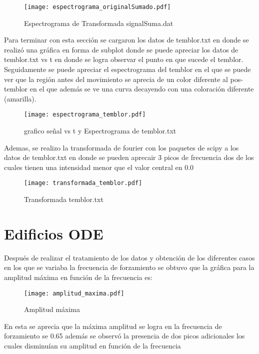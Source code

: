 \documentclass[12pt]{article}
\begin{document}
\begin{figure}[h!]
\centering
\texttt{[image: espectrograma\_originalSumado.pdf]}
\caption{Espectrograma de Transformada signalSuma.dat }
\label{Fig.}
\end{figure}

Para terminar con esta sección se cargaron los datos de temblor.txt en donde se realizó una gráfica en forma de subplot donde se puede apreciar los datos de temblor.txt vs t en donde se logra observar el punto en que sucede el temblor. Seguidamente se puede apreciar el espectrograma del temblor en el que se puede ver que la región antes del movimiento se aprecia de un color diferente al pos-temblor en el que además se ve una curva decayendo con una coloración diferente (amarilla).
  
\begin{figure}[h!]
\centering
\texttt{[image: espectrograma\_temblor.pdf]}
\caption{grafico señal vs t y Espectrograma de temblor.txt }
\label{Fig.}
\end{figure}

Ademas, se realizo la transformada de fourier con los paquetes de scipy a los datos de temblor.txt en donde se pueden aprecair 3 picos de frecuencia dos de los cuales tienen una intensidad menor que el valor central en 0.0 

\begin{figure}[h!]
\centering
\texttt{[image: transformada\_temblor.pdf]}
\caption{Transformada temblor.txt }
\label{Fig.}
\end{figure}


\section{Edificios ODE}

Después de realizar el tratamiento de los datos y obtención de los diferentes casos en los que se variaba la frecuencia de forzamiento se obtuvo que la gráfica para la amplitud máxima en función de la frecuencia es:  

\begin{figure}[h!]
\centering
\texttt{[image: amplitud\_maxima.pdf]}
\caption{Amplitud máxima }
\label{Fig.}
\end{figure}

En esta se aprecia que la máxima amplitud se logra en la frecuencia de forzamiento se 0.65 además se observó la presencia de dos picos adicionales los cuales disminuían su amplitud en función de la frecuencia  
\end{document}
